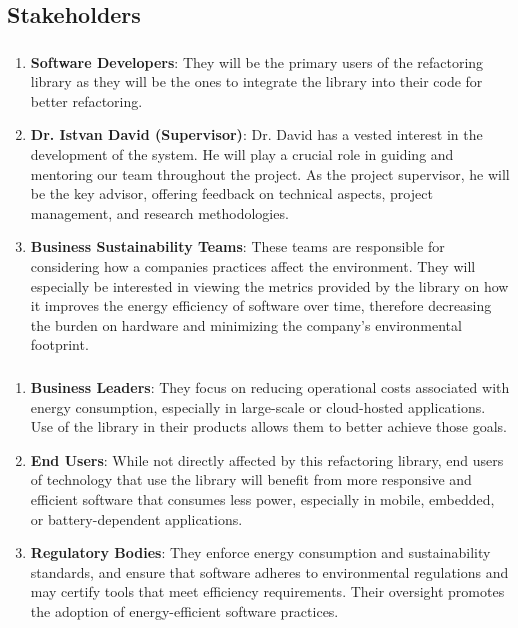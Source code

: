 \documentclass{article}
\begin{document}
\subsection{Stakeholders}
\subsubsection*{\color{blue}{Direct Stakeholders}}
\begin{enumerate}

  \item \textbf{Software Developers}: They will be the primary users
    of the refactoring library as they will be the ones to integrate
    the library into their code for better refactoring.
  \item \textbf{Dr. Istvan David (Supervisor)}: Dr. David has a
    vested interest in the development of the system. He will play a
    crucial role in guiding and mentoring our team throughout the
    project. As the project supervisor, he will be the key advisor,
    offering feedback on technical aspects, project management, and
    research methodologies.
  \item \textbf{Business Sustainability Teams}: These teams are
    responsible for considering how a companies practices affect the
    environment. They will especially be interested in viewing the
    metrics provided by the library on how it improves the energy
    efficiency of software over time, therefore decreasing the burden
    on hardware and minimizing the company's environmental footprint.

\end{enumerate}

\subsubsection*{\color{blue}{Indirect Stakeholders}}
\begin{enumerate}

  \item \textbf{Business Leaders}: They focus on reducing operational
    costs associated with energy consumption, especially in
    large-scale or cloud-hosted applications. Use of the library in
    their products allows them to better achieve those goals.
  \item \textbf{End Users}: While not directly affected by this
    refactoring library, end users of technology that use the library
    will benefit from more responsive and efficient software that
    consumes less power, especially in mobile, embedded, or
    battery-dependent applications.
  \item \textbf{Regulatory Bodies}: They enforce energy consumption
    and sustainability standards, and ensure that software adheres to
    environmental regulations and may certify tools that meet
    efficiency requirements. Their oversight promotes the adoption of
    energy-efficient software practices.

\end{enumerate}
\end{document}
